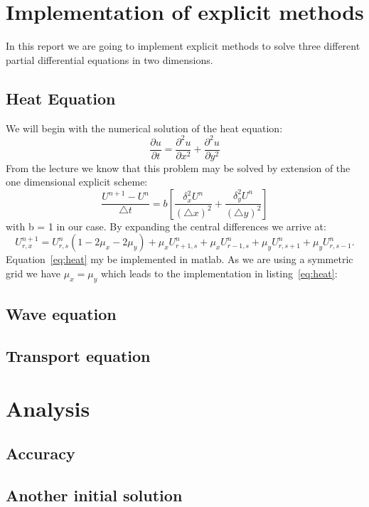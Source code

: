 \documentclass[ twoside,openright,titlepage,numbers=noenddot,headinclude,%
                footinclude=true,cleardoublepage=empty,abstractoff, %
                BCOR=5mm,paper=a4,fontsize=11pt,%
                ngerman,american,%
                ]{scrreprt}
\begin{document}
\frenchspacing
\raggedbottom
{} %
\pagestyle{plain}

%
\pagestyle{scrheadings}



\chapter{Implementation of explicit methods}
In this report we are going to implement explicit methods to solve three different partial differential equations in two dimensions.
\section{Heat Equation}
We will begin with the numerical solution of the heat equation:
\begin{equation}
\frac{\partial u}{\partial t} = \frac{\partial^2 u}{\partial x^2} + \frac{\partial^2 u}{\partial y^2}
\end{equation}
From the lecture we know that this problem may be solved by extension of the one dimensional explicit scheme:
\begin{equation}
\frac{U^{n+1}-U^{n}}{\triangle t} = b [\frac{\delta_x^2 U^n}{(\triangle x)^2} + \frac{\delta_y^2 U^n}{(\triangle y)^2} ]
\end{equation}
with b = 1 in our case. By expanding the central differences we arrive at:
\begin{equation}
U_{r,x}^{n+1} = U_{r,s}^n (1 - 2\mu_x - 2\mu_y) + \mu_x U_{r+1,s}^n + \mu_x U_{r-1,s}^n + \mu_y U_{r,s+1}^n + \mu_y U_{r,s-1}^n.
\label{eq:heat}
\end{equation}
Equation~\ref{eq:heat} my be implemented in matlab.  As we are using a symmetric grid we have $\mu_x = \mu_y$ which leads to the implementation in listing~\ref{eq:heat}: 



\section{Wave equation}

\section{Transport equation}

\chapter{Analysis}
\section{Accuracy}

\section{Another initial solution}
\end{document}
